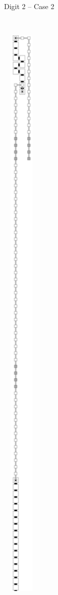 \begin{figure}[H]
\begin{subfigure}[t]{0.2\textwidth}
            \caption{\label{fig:digit_top_case2_digit2_msr} Digit 2 -- Case 2}
        \end{subfigure}%
        ~
        \begin{subfigure}[t]{0.2\textwidth}
            \centering
            \includegraphics[width=0.2\textwidth]{digit_tops/digit_top_case1_digit1_msr}

\end{subfigure}
\end{figure}
